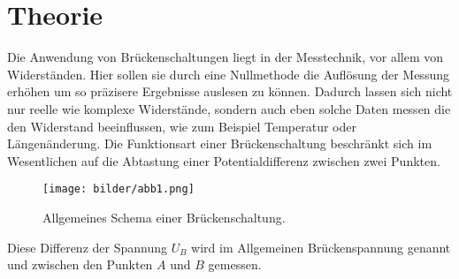 \section{Theorie}
Die Anwendung von Brückenschaltungen liegt in der Messtechnik,  vor allem von Widerständen. 
Hier sollen sie durch eine Nullmethode die Auflösung der Messung erhöhen um so präzisere Ergebnisse
auslesen zu können. Dadurch lassen sich nicht nur reelle wie komplexe Widerstände, sondern auch eben 
solche Daten messen die den Widerstand beeinflussen, wie zum Beispiel Temperatur oder Längenänderung. %
Die Funktionsart einer Brückenschaltung beschränkt sich im Wesentlichen auf die Abtastung einer 
Potentialdifferenz zwischen zwei Punkten. 
\begin{figure}
    \centering
    \texttt{[image: bilder/abb1.png]}
    \caption{Allgemeines Schema einer Brückenschaltung. \cite{skript}} 
    \label{fig:abb1}
\end{figure}
Diese Differenz der Spannung $U_{B}$ wird im Allgemeinen Brückenspannung genannt und zwischen den Punkten $A$ und $B$ gemessen.
\\
\newline



